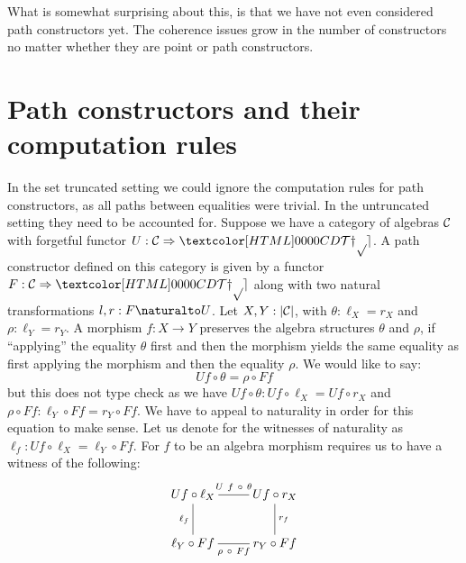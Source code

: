 What is somewhat surprising about this, is that we have not even
considered path constructors yet. The coherence issues grow in the
number of constructors no matter whether they are point or path
constructors.

\section{Path constructors and their computation rules}

In the set truncated setting we could ignore the computation rules for
path constructors, as all paths between equalities were trivial. In
the untruncated setting they need to be accounted for. Suppose we have
a category of algebras $\mathcal{C}$ with forgetful functor
$U : \Func{\Cc}{\TYPE}$. A path constructor defined on this category
is given by a functor $F : \Func{\Cc}{\TYPE}$ along with two natural
transformations $l,r : \Nat{F}{U}$. Let $X, Y : | \mathcal{C} |$, with
$\theta : \ell_X = r_X$ and $\rho : \ell_Y = r_Y$. A morphism
$f : X \to Y$ preserves the algebra structures $\theta$ and $\rho$, if
``applying'' the equality $\theta$ first and then the morphism yields
the same equality as first applying the morphism and then the equality
$\rho$. We would like to say:
$$
U f \circ \theta = \rho \circ F f
$$
but this does not type check as we have
$U f \circ \theta : U f \circ \ell_X = U f \circ r_X$ and
$\rho \circ Ff : \ell_Y \circ F f = r_Y \circ F f$. We have to appeal to
naturality in order for this equation to make sense. Let us denote for
the witnesses of naturality as $\ell_f : Uf \circ \ell_X = \ell_Y \circ
Ff$.
For $f$ to be an algebra morphism requires us to have a witness of the
following:
$$
\xymatrix{
U f \circ \ell_X
\ar@{-}[r]^-{U\ f\ \circ\ \theta}
\ar@{-}[d]_-{\ell_f}
&U f \circ r_X
\ar@{-}[d]^-{r_f}
\\
\ell_Y \circ Ff
\ar@{-}[r]_-{\rho\ \circ\ Ff}
&r_Y \circ Ff
}
$$
